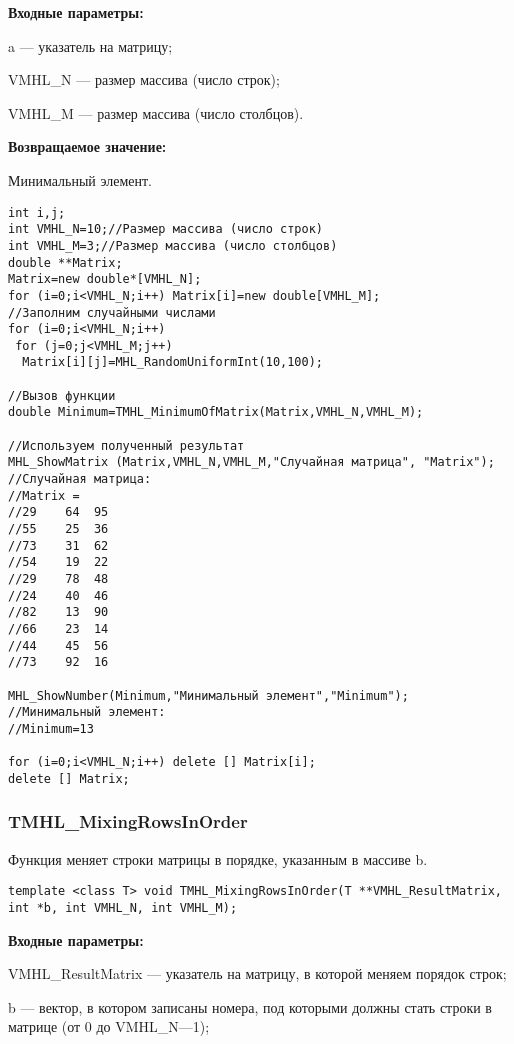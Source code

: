 \documentclass[a4paper,12pt]{article}
\begin{document}
\textbf{Входные параметры:}

 a --- указатель на матрицу;
 
 VMHL\_N --- размер массива (число строк);
 
 VMHL\_M --- размер массива (число столбцов).

\textbf{Возвращаемое значение:}

 Минимальный элемент.


\begin{lstlisting}[label=code_use_TMHL_MinimumOfMatrix,caption=Пример использования]
int i,j;
int VMHL_N=10;//Размер массива (число строк)
int VMHL_M=3;//Размер массива (число столбцов)
double **Matrix;
Matrix=new double*[VMHL_N];
for (i=0;i<VMHL_N;i++) Matrix[i]=new double[VMHL_M];
//Заполним случайными числами
for (i=0;i<VMHL_N;i++)
 for (j=0;j<VMHL_M;j++)
  Matrix[i][j]=MHL_RandomUniformInt(10,100);

//Вызов функции
double Minimum=TMHL_MinimumOfMatrix(Matrix,VMHL_N,VMHL_M);

//Используем полученный результат
MHL_ShowMatrix (Matrix,VMHL_N,VMHL_M,"Случайная матрица", "Matrix");
//Случайная матрица:
//Matrix =
//29	64	95
//55	25	36
//73	31	62
//54	19	22
//29	78	48
//24	40	46
//82	13	90
//66	23	14
//44	45	56
//73	92	16

MHL_ShowNumber(Minimum,"Минимальный элемент","Minimum");
//Минимальный элемент:
//Minimum=13

for (i=0;i<VMHL_N;i++) delete [] Matrix[i];
delete [] Matrix;
\end{lstlisting}

\subsubsection{TMHL\_MixingRowsInOrder}\label{TMHL_MixingRowsInOrder}

Функция меняет строки матрицы в порядке, указанным в массиве b.


\begin{lstlisting}[label=code_syntax_TMHL_MixingRowsInOrder,caption=Синтаксис]
template <class T> void TMHL_MixingRowsInOrder(T **VMHL_ResultMatrix, int *b, int VMHL_N, int VMHL_M);
\end{lstlisting}

\textbf{Входные параметры:}
 
VMHL\_ResultMatrix --- указатель на матрицу, в которой меняем порядок строк;
 
b --- вектор, в котором записаны номера, под которыми должны стать строки в матрице (от 0 до VMHL\_N---1);
 
\end{document}
